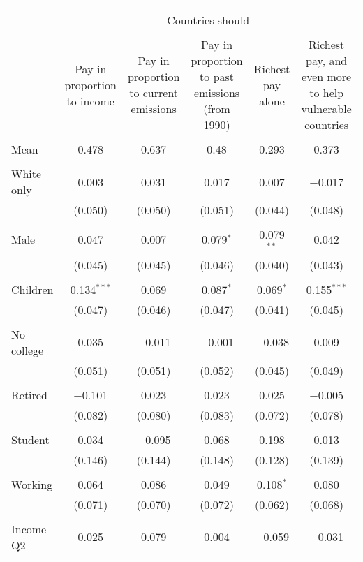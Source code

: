 
\begin{tabular}{@{\extracolsep{5pt}}lccccc} 
\\[-1.8ex]\hline 
\hline \\[-1.8ex] 
 & \multicolumn{5}{c}{Countries should} \\ 
\cline{2-6} 
\\[-1.8ex] & Pay in proportion to income & Pay in proportion to current emissions & Pay in proportion to past emissions (from 1990) & Richest pay alone & Richest pay, and even more to help vulnerable countries \\ 
\hline \\[-1.8ex] 
 Mean & 0.478 & 0.637 & 0.48 & 0.293 & 0.373  \\ \hline \\[-1.8ex] White only & 0.003 & 0.031 & 0.017 & 0.007 & $-$0.017 \\ 
  & (0.050) & (0.050) & (0.051) & (0.044) & (0.048) \\ 
  & & & & & \\ 
 Male & 0.047 & 0.007 & 0.079$^{*}$ & 0.079$^{**}$ & 0.042 \\ 
  & (0.045) & (0.045) & (0.046) & (0.040) & (0.043) \\ 
  & & & & & \\ 
 Children & 0.134$^{***}$ & 0.069 & 0.087$^{*}$ & 0.069$^{*}$ & 0.155$^{***}$ \\ 
  & (0.047) & (0.046) & (0.047) & (0.041) & (0.045) \\ 
  & & & & & \\ 
 No college & 0.035 & $-$0.011 & $-$0.001 & $-$0.038 & 0.009 \\ 
  & (0.051) & (0.051) & (0.052) & (0.045) & (0.049) \\ 
  & & & & & \\ 
 Retired & $-$0.101 & 0.023 & 0.023 & 0.025 & $-$0.005 \\ 
  & (0.082) & (0.080) & (0.083) & (0.072) & (0.078) \\ 
  & & & & & \\ 
 Student & 0.034 & $-$0.095 & 0.068 & 0.198 & 0.013 \\ 
  & (0.146) & (0.144) & (0.148) & (0.128) & (0.139) \\ 
  & & & & & \\ 
 Working & 0.064 & 0.086 & 0.049 & 0.108$^{*}$ & 0.080 \\ 
  & (0.071) & (0.070) & (0.072) & (0.062) & (0.068) \\ 
  & & & & & \\ 
 Income Q2 & 0.025 & 0.079 & 0.004 & $-$0.059 & $-$0.031 \\ 

\end{tabular}

